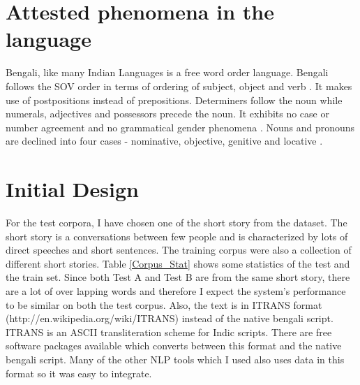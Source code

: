 \documentclass[11pt,letterpaper]{article}
\begin{document}
\section{Attested phenomena in the language}
Bengali, like many Indian Languages is a free word order language. Bengali follows the SOV order in terms of ordering of subject, object and verb \citep{Dasgupta-2003}. It makes use of postpositions instead of prepositions. Determiners follow the noun while numerals, adjectives and possessors precede the noun. It exhibits no case or number agreement and no grammatical gender phenomena \citep{Dasgupta-2003}. Nouns and pronouns are declined into four cases - nominative, objective, genitive and locative \citep{Bhattacharya}. 




\section{Initial Design}

For the test corpora, I have chosen one of the short story from the dataset. The short story is a conversations between few people and is characterized by lots of direct speeches and short sentences. The training corpus were also a collection of different short stories. Table \ref{Corpus_Stat} shows some statistics of the test and the train set. Since both Test A and Test B are from the same short story, there are a lot of over lapping words and therefore I expect the system's performance to  be similar on both the test corpus. Also, the text is in ITRANS format (http://en.wikipedia.org/wiki/ITRANS) instead of the native bengali script. ITRANS is an ASCII transliteration scheme for Indic scripts. There are free software packages available which converts between this format and the native bengali script. Many of the other NLP tools which I used also uses data in this format so it was easy to integrate.
\end{document}
